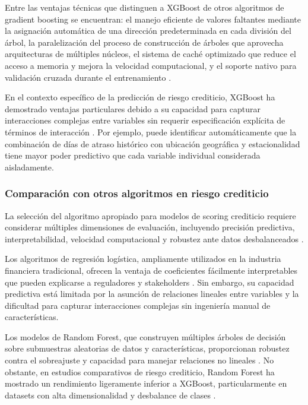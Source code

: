Entre las ventajas técnicas que distinguen a XGBoost de otros algoritmos de gradient boosting se encuentran: el manejo eficiente de valores faltantes mediante la asignación automática de una dirección predeterminada en cada división del árbol, la paralelización del proceso de construcción de árboles que aprovecha arquitecturas de múltiples núcleos, el sistema de caché optimizado que reduce el acceso a memoria y mejora la velocidad computacional, y el soporte nativo para validación cruzada durante el entrenamiento \citep{chen2016xgboost}.

En el contexto específico de la predicción de riesgo crediticio, XGBoost ha demostrado ventajas particulares debido a su capacidad para capturar interacciones complejas entre variables sin requerir especificación explícita de términos de interacción \citep{lessmann2015benchmarking}. Por ejemplo, puede identificar automáticamente que la combinación de días de atraso histórico con ubicación geográfica y estacionalidad tiene mayor poder predictivo que cada variable individual considerada aisladamente.

\subsubsection{Comparación con otros algoritmos en riesgo crediticio}
La selección del algoritmo apropiado para modelos de scoring crediticio requiere considerar múltiples dimensiones de evaluación, incluyendo precisión predictiva, interpretabilidad, velocidad computacional y robustez ante datos desbalanceados \citep{lessmann2015benchmarking}.

Los algoritmos de regresión logística, ampliamente utilizados en la industria financiera tradicional, ofrecen la ventaja de coeficientes fácilmente interpretables que pueden explicarse a reguladores y stakeholders \citep{baesens2003benchmarking}. Sin embargo, su capacidad predictiva está limitada por la asunción de relaciones lineales entre variables y la dificultad para capturar interacciones complejas sin ingeniería manual de características.

Los modelos de Random Forest, que construyen múltiples árboles de decisión sobre submuestras aleatorias de datos y características, proporcionan robustez contra el sobreajuste y capacidad para manejar relaciones no lineales \citep{breiman2001random}. No obstante, en estudios comparativos de riesgo crediticio, Random Forest ha mostrado un rendimiento ligeramente inferior a XGBoost, particularmente en datasets con alta dimensionalidad y desbalance de clases \citep{lessmann2015benchmarking}.

